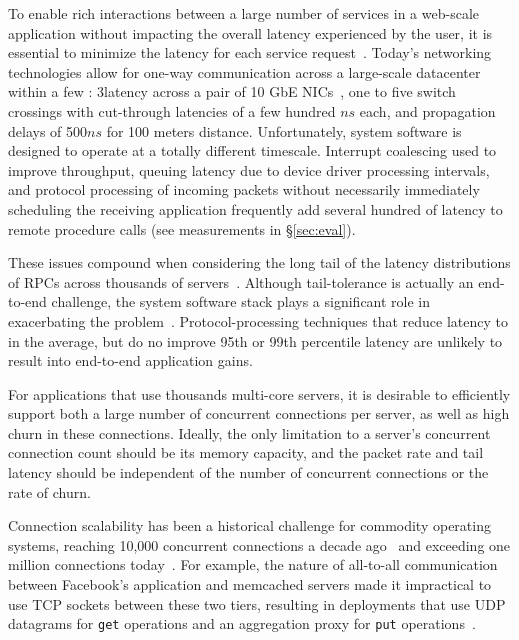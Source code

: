  To enable rich interactions between a
large number of services in a web-scale application without impacting
the overall latency experienced by the user, it is essential to
minimize the latency for each service
request~\cite{luiz-isscc,rumble2011s}. Today's networking
technologies allow for one-way communication across a large-scale
datacenter within a few \microsecond: 3\microsecond latency across
a pair of 10 GbE NICs~\cite{cisco-sereno}, one to five switch
crossings with cut-through latencies of a few hundred $ns$ each, and
propagation delays of 500$ns$ for 100 meters distance. Unfortunately,
system software is designed to operate at a totally different
timescale. Interrupt coalescing used to improve throughput, queuing
latency due to device driver processing intervals, and protocol
processing of incoming packets without necessarily immediately
scheduling the receiving application frequently add several hundred \microsecond of
latency to remote procedure calls (see measurements in \S\ref{sec:eval}).


These issues compound when considering the long tail of the latency
distributions of RPCs across thousands of
servers~\cite{DBLP:journals/cacm/DeanB13}. Although tail-tolerance is
actually an end-to-end challenge, the system software stack plays a
significant role in exacerbating the problem~\cite{Leverich:RHSU:2014}.
Protocol-processing techniques that reduce latency to \microsecond in
the average, but do no improve 95th or 99th percentile latency are
unlikely to result into end-to-end application gains.

 For applications that use thousands
multi-core servers, it is desirable to efficiently support both a
large number of concurrent connections per server, as well as high
churn in these connections.  Ideally, the only limitation to a
server's concurrent connection count should be its memory capacity, and
the packet rate and tail latency should be independent of the number
of concurrent connections or the rate of churn.
 
Connection scalability has been a historical challenge for commodity
operating systems, reaching 10,000 concurrent connections a decade
ago~\cite{theC10Kproblem} and exceeding one million connections
today~\cite{theC10Mproblem}. For example, the nature of all-to-all
communication between Facebook's application and memcached servers
made it impractical to use TCP sockets between these two tiers,
resulting in deployments that use UDP datagrams for \texttt{get}
operations and an aggregation proxy for \texttt{put}
operations~\cite{nishtala2013scaling}.

